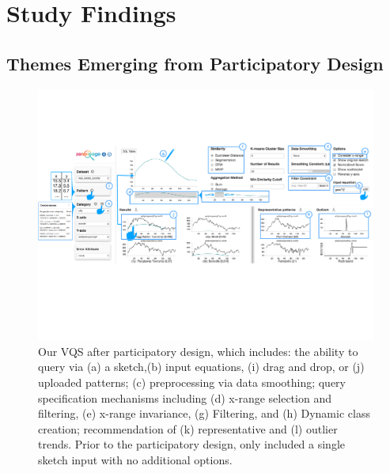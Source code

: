 \section{Study Findings}
\subsection{Themes Emerging from Participatory Design\label{pd_findings}}
\begin{figure}[t!]
\centering
\vspace{-15pt}
\includegraphics[width=\linewidth]{figures/system.pdf} %
\vspace{-5pt}\caption{Our VQS after participatory design, which includes: the ability to query via (a) a sketch,(b) input equations, (i) drag and drop, or (j) uploaded patterns; (c) preprocessing via data smoothing; query specification mechanisms including (d) x-range selection and filtering, (e) x-range invariance, (g) Filtering, and (h) Dynamic class creation; recommendation of (k) representative and (l) outlier trends. Prior to the participatory design, \zv only included a single sketch input with no additional options.}
\label{zvOverview}
\vspace{-14pt}
\end{figure}

